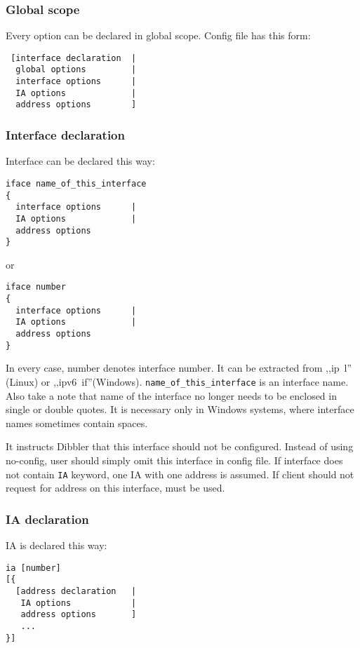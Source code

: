 \subsubsection{Global scope}

Every option can be declared in global scope.
Config file has this form:

\begin{verbatim}
 [interface declaration	 |
  global options         |
  interface options      |
  IA options             |
  address options        ]
\end{verbatim}

\subsubsection{Interface declaration}

Interface can be declared this way:
\begin{verbatim}
iface name_of_this_interface
{
  interface options      |
  IA options             |
  address options        
}
\end{verbatim}

or 

\begin{verbatim}
iface number 
{
  interface options      |
  IA options             |
  address options        
}
\end{verbatim}

In every case, number denotes interface number. It can be extracted
from ,,ip~l'' (Linux) or
,,ipv6~if''(Windows). \verb+name_of_this_interface+ is an interface
name.  Also take a note that name of the interface
no longer needs to be enclosed in single or double quotes. It is
necessary only in Windows
systems, where interface names sometimes contain spaces.

It instructs Dibbler that this interface should not be
configured. Instead of using no-config, user should simply omit this
interface in config file. 
If interface does not contain \verb+IA+ keyword, one IA with one address is
assumed. If client should not request for address on this interface, 
must be used.

\subsubsection{IA declaration}

IA is declared this way:

\begin{verbatim}
ia [number]
[{ 
  [address declaration   | 
   IA options            | 
   address options       ] 
   ...          
}]
\end{verbatim}

